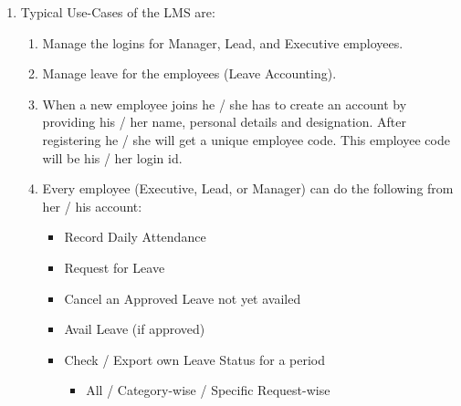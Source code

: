 \documentclass{article}
\begin{document}
\begin{footnotesize}
\begin{enumerate}
\begin{itemize}
\begin{itemize}
\item All LWP's must be pre-approved (at least by a week) and are of exceptional nature. Hence are always approved by the Manager.
\end{itemize}
\end{itemize}

{\em Note}: 
\begin{itemize}
\item Every leave (leaving aside the exceptions mentioned above) for an employee is approved / regretted by the Lead or Manager to whom he / she reports. 
\item Leave is a privilege and not a right. Hence an approved leave can be revoked.
\item Any other leave of absence is considered an Unauthorized Leave (UL) for which salary is deducted. More than a week's UL warrants disciplinary actions.
\end{itemize}

\item Typical Use-Cases of the LMS are:

\begin{enumerate}
\item Manage the logins for Manager, Lead, and Executive employees.

\item Manage leave for the employees (Leave Accounting).

\item When a new employee joins he / she has to create an account by providing his / her name, personal details and designation.  After registering he / she will get a unique employee code. This employee code will be his / her login id. 

\item Every employee (Executive, Lead, or Manager) can do the following from her / his account:
\begin{itemize}
\item Record Daily Attendance 
\item Request for Leave
\item Cancel an Approved Leave not yet availed
\item Avail Leave (if approved)
\item Check / Export own Leave Status for a period
\begin{itemize}
\item All / Category-wise / Specific Request-wise
\end{itemize} 
\end{itemize}


\end{enumerate}
\end{enumerate}
\end{footnotesize}
\end{document}

